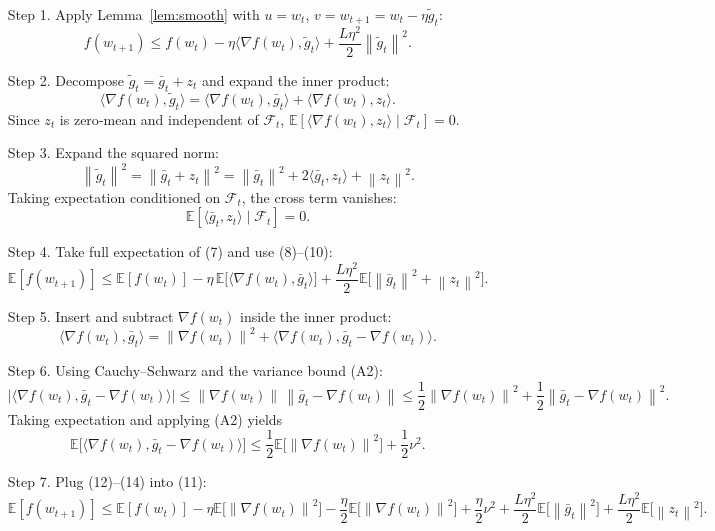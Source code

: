\documentclass{article}
\newcommand{\E}{\mathbb{E}}
\newcommand{\norm}[1]{\left\|#1\right\|}
\newcommand{\grad}{\nabla}
\begin{document}
\begin{enumerate}
\item[Step 1.] Apply Lemma~\ref{lem:smooth} with $u=w_t$, $v=w_{t+1}=w_t-\eta\tilde g_t$:
\[
f(w_{t+1})
\le f(w_t)-\eta\langle\grad f(w_t),\tilde g_t\rangle
+\frac{L\eta^2}{2}\norm{\tilde g_t}^2.
\tag{7}
\]

\item[Step 2.] Decompose $\tilde g_t=\bar g_t+z_t$ and expand the inner product:
\[
\langle\grad f(w_t),\tilde g_t\rangle
=\langle\grad f(w_t),\bar g_t\rangle
+\langle\grad f(w_t),z_t\rangle.
\tag{8}
\]
Since $z_t$ is zero‑mean and independent of $\mathcal F_t$, $\E[\langle\grad f(w_t),z_t\rangle\mid\mathcal F_t]=0$.

\item[Step 3.] Expand the squared norm:
\[
\norm{\tilde g_t}^2
=\norm{\bar g_t+z_t}^2
=\norm{\bar g_t}^2+2\langle\bar g_t,z_t\rangle+\norm{z_t}^2.
\tag{9}
\]
Taking expectation conditioned on $\mathcal F_t$, the cross term vanishes:
\[
\E[\langle\bar g_t,z_t\rangle\mid\mathcal F_t]=0.
\tag{10}
\]

\item[Step 4.] Take full expectation of (7) and use (8)–(10):
\[
\E[f(w_{t+1})]
\le \E[f(w_t)]
-\eta\,\E\!\bigl[\langle\grad f(w_t),\bar g_t\rangle\bigr]
+\frac{L\eta^2}{2}\E\!\bigl[\norm{\bar g_t}^2+\norm{z_t}^2\bigr].
\tag{11}
\]

\item[Step 5.] Insert and subtract $\grad f(w_t)$ inside the inner product:
\[
\langle\grad f(w_t),\bar g_t\rangle
=\norm{\grad f(w_t)}^2
+\langle\grad f(w_t),\bar g_t-\grad f(w_t)\rangle.
\tag{12}
\]

\item[Step 6.] Using Cauchy–Schwarz and the variance bound (A2):
\[
\bigl|\langle\grad f(w_t),\bar g_t-\grad f(w_t)\rangle\bigr|
\le \norm{\grad f(w_t)}\,
\norm{\bar g_t-\grad f(w_t)}
\le \frac{1}{2}\norm{\grad f(w_t)}^2
+\frac{1}{2}\norm{\bar g_t-\grad f(w_t)}^2.
\tag{13}
\]
Taking expectation and applying (A2) yields
\[
\E\!\bigl[\langle\grad f(w_t),\bar g_t-\grad f(w_t)\rangle\bigr]
\le \frac12\E\!\bigl[\norm{\grad f(w_t)}^2\bigr]
+\frac12\nu^2.
\tag{14}
\]

\item[Step 7.] Plug (12)–(14) into (11):
\[
\E[f(w_{t+1})]
\le \E[f(w_t)]
-\eta\E\!\bigl[\norm{\grad f(w_t)}^2\bigr]
-\frac{\eta}{2}\E\!\bigl[\norm{\grad f(w_t)}^2\bigr]
+\frac{\eta}{2}\nu^2
+\frac{L\eta^2}{2}\E\!\bigl[\norm{\bar g_t}^2\bigr]
+\frac{L\eta^2}{2}\E\!\bigl[\norm{z_t}^2\bigr].
\tag{15}
\]


\end{enumerate}
\end{document}
